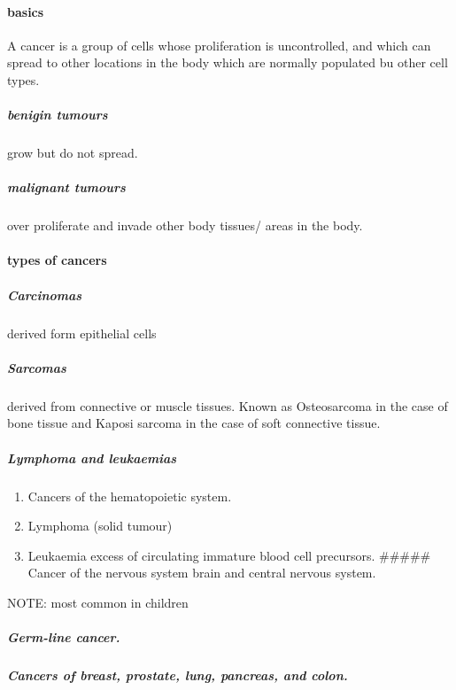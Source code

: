 \documentclass[]{article}
\providecommand{\tightlist}{%
  \setlength{\itemsep}{0pt}\setlength{\parskip}{0pt}}
\let\oldparagraph\paragraph
\renewcommand{\paragraph}[1]{\oldparagraph{#1}\mbox{}}
\let\oldsubparagraph\subparagraph
\renewcommand{\subparagraph}[1]{\oldsubparagraph{#1}\mbox{}}
\begin{document}
\hypertarget{basics}{%
\paragraph{basics}\label{basics}}

A cancer is a group of cells whose proliferation is uncontrolled, and
which can spread to other locations in the body which are normally
populated bu other cell types.

\hypertarget{benigin-tumours}{%
\subparagraph{benigin tumours}\label{benigin-tumours}}

grow but do not spread.

\hypertarget{malignant-tumours}{%
\subparagraph{malignant tumours}\label{malignant-tumours}}

over proliferate and invade other body tissues/ areas in the body.

\hypertarget{types-of-cancers}{%
\paragraph{types of cancers}\label{types-of-cancers}}

\hypertarget{carcinomas}{%
\subparagraph{Carcinomas}\label{carcinomas}}

derived form epithelial cells

\hypertarget{sarcomas}{%
\subparagraph{Sarcomas}\label{sarcomas}}

derived from connective or muscle tissues. Known as Osteosarcoma in the
case of bone tissue and Kaposi sarcoma in the case of soft connective
tissue.

\hypertarget{lymphoma-and-leukaemias}{%
\subparagraph{Lymphoma and leukaemias}\label{lymphoma-and-leukaemias}}

\begin{enumerate}
\def\labelenumi{\arabic{enumi}.}
\tightlist
\item
  Cancers of the hematopoietic system.
\item
  Lymphoma (solid tumour)
\item
  Leukaemia excess of circulating immature blood cell precursors.
  \#\#\#\#\# Cancer of the nervous system brain and central nervous
  system.
\end{enumerate}

NOTE: most common in children

\hypertarget{germ-line-cancer.}{%
\subparagraph{Germ-line cancer.}\label{germ-line-cancer.}}

\hypertarget{cancers-of-breast-prostate-lung-pancreas-and-colon.}{%
\subparagraph{Cancers of breast, prostate, lung, pancreas, and
colon.}\label{cancers-of-breast-prostate-lung-pancreas-and-colon.}}
\end{document}
